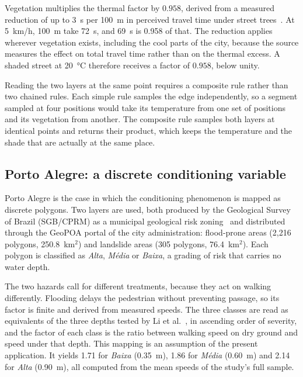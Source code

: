 Vegetation multiplies the thermal factor by $0.958$, derived from a measured reduction of up to 3~s per 100~m in perceived travel time under street trees~\cite{Jia2023GreeningWalk}. At 5~km/h, 100~m take 72~s, and 69~s is 0.958 of that. The reduction applies wherever vegetation exists, including the cool parts of the city, because the source measures the effect on total travel time rather than on the thermal excess. A shaded street at 20~°C therefore receives a factor of $0.958$, below unity.

Reading the two layers at the same point requires a composite rule rather than two chained rules. Each simple rule samples the edge independently, so a segment sampled at four positions would take its temperature from one set of positions and its vegetation from another. The composite rule samples both layers at identical points and returns their product, which keeps the temperature and the shade that are actually at the same place.

\subsection{Porto Alegre: a discrete conditioning variable}
\label{subsec:porto-alegre}

Porto Alegre is the case in which the conditioning phenomenon is mapped as discrete polygons. Two layers are used, both produced by the Geological Survey of Brazil (SGB/CPRM) as a municipal geological risk zoning~\cite{Bellettini2022RiscoPOA} and distributed through the GeoPOA portal of the city administration: flood-prone areas (2,216 polygons, 250.8~km$^2$) and landslide areas (305 polygons, 76.4~km$^2$). Each polygon is classified as \textit{Alta}, \textit{Média} or \textit{Baixa}, a grading of risk that carries no water depth.

The two hazards call for different treatments, because they act on walking differently. Flooding delays the pedestrian without preventing passage, so its factor is finite and derived from measured speeds. The three classes are read as equivalents of the three depths tested by Li et al.~\cite{Li2026WaterDepth}, in ascending order of severity, and the factor of each class is the ratio between walking speed on dry ground and speed under that depth. This mapping is an assumption of the present application. It yields 1.71 for \textit{Baixa} (0.35~m), 1.86 for \textit{Média} (0.60~m) and 2.14 for \textit{Alta} (0.90~m), all computed from the mean speeds of the study's full sample.

